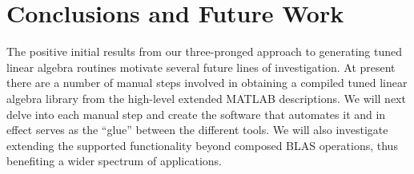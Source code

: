 \documentclass[11pt]{article}
\begin{document}












\section{Conclusions and Future Work}

The positive initial results from our three-pronged approach to generating tuned linear algebra routines motivate several future lines of investigation. At present there are a number of manual steps involved in obtaining a compiled tuned linear algebra library from the high-level extended MATLAB descriptions. We will next delve into each manual step and create the software that automates it and in effect serves as the ``glue'' between the different tools. We will also investigate extending the supported functionality beyond composed BLAS operations, thus benefiting a wider spectrum of applications.
\end{document}

